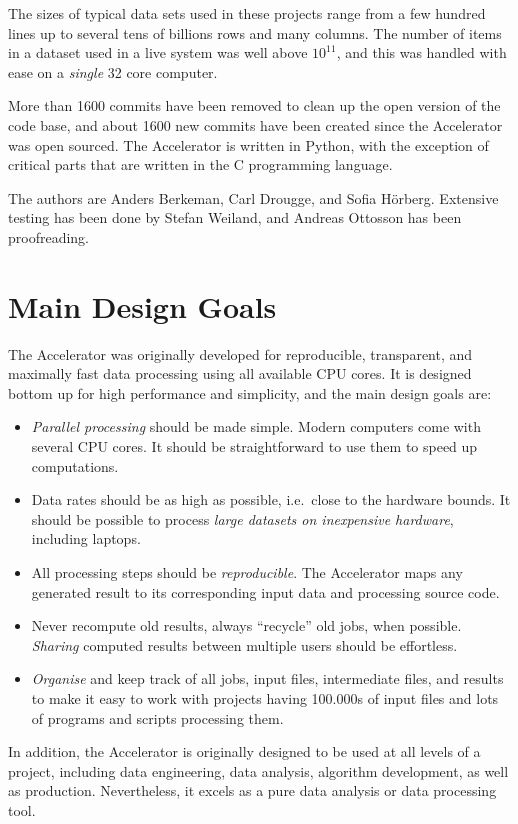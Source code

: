 The sizes of typical data sets used in these projects range from a few
hundred lines up to several tens of billions rows and many columns.
The number of items in a dataset used in a live system was well above
$10^{11}$, and this was handled with ease on a \emph{single} 32 core
computer.

More than 1600 commits have been removed to clean up the open version
of the code base, and about 1600 new commits have been created since
the Accelerator was open sourced.  The Accelerator is written in
Python, with the exception of critical parts that are written in the C
programming language.

The authors are Anders Berkeman, Carl Drougge, and Sofia H\"orberg.
Extensive testing has been done by Stefan Weiland, and Andreas
Ottosson has been proofreading.



\section{Main Design Goals}
The Accelerator was originally developed for reproducible,
transparent, and maximally fast data processing using all available
CPU cores.  It is designed bottom up for high performance and
simplicity, and the main design goals are:
\begin{itemize}

\item[] \textsl{Parallel processing} should be made simple.  Modern computers
  come with several CPU cores.  It should be straightforward to use
  them to speed up computations.
  
\item[] Data rates should be as high as possible, i.e.\ close to the hardware
  bounds.  It should be possible to process \textsl{large datasets on
  inexpensive hardware}, including laptops.

\item[] All processing steps should be \textsl{reproducible}.
  The Accelerator maps any generated result to its corresponding input
  data and processing source code.

\item[] Never recompute old results, always ``recycle'' old jobs, when
  possible.  \textsl{Sharing} computed results between multiple users
  should be effortless.

\item[] \textsl{Organise} and keep track of all jobs, input files,
  intermediate files, and results to make it easy to work with
  projects having 100.000s of input files and lots of programs and
  scripts processing them.
  
\end{itemize}
In addition, the Accelerator is originally designed to be used at all
levels of a project, including data engineering, data analysis,
algorithm development, as well as production.  Nevertheless, it excels
as a pure data analysis or data processing tool.
